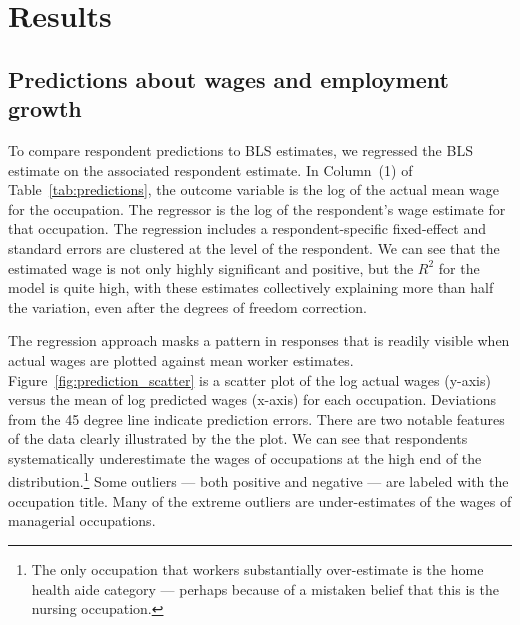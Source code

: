 \documentclass[12pt]{article}
\begin{document}

\section{Results}

\subsection{Predictions about wages and employment growth}

To compare respondent predictions to BLS estimates, we regressed the BLS estimate on the associated respondent estimate. 
In Column~(1) of Table~\ref{tab:predictions}, the outcome variable is the log of the actual mean wage for the occupation. 
The regressor is the log of the respondent's wage estimate for that occupation. 
The regression includes a respondent-specific fixed-effect and standard errors are clustered at the level of the respondent. 
We can see that the estimated wage is not only highly significant and positive, but the $R^2$ for the model is quite high, with these estimates collectively explaining more than half the variation, even after the degrees of freedom correction. 


The regression approach masks a pattern in responses that is readily visible when actual wages are plotted against mean worker estimates. 
Figure~\ref{fig:prediction_scatter} is a scatter plot of the log actual wages (y-axis) versus the mean of log predicted wages (x-axis) for each occupation. 
Deviations from the 45 degree line indicate prediction errors. 
There are two notable features of the data clearly illustrated by the the plot. 
We can see that respondents systematically underestimate the wages of occupations at the high end of the distribution.\footnote{The only occupation that workers substantially over-estimate is the home health aide category --- perhaps because of a mistaken belief that this is the nursing occupation.}  
Some outliers --- both positive and negative --- are labeled with the occupation title.  
Many of the extreme outliers are under-estimates of the wages of managerial occupations. 
\end{document}
